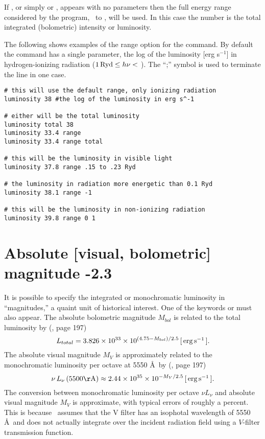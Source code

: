 If , or simply  or ,
appears with no parameters then the
full energy range considered by the program,
\emm\ to
\egamry , will be used.
In this case the number is the total integrated (bolometric) intensity
or luminosity.

The following shows examples of the range option for the
 command.
By default the  command has a single parameter,
the log of the luminosity [erg s$^{-1}$] in hydrogen-ionizing
radiation ($1 {\rm\thinspace Ryd} \le  h\nu <$ \egamry ).
The ``;'' symbol is used to terminate the line in one
case.
\begin{verbatim}
# this will use the default range, only ionizing radiation
luminosity 38 #the log of the luminosity in erg s^-1

# either will be the total luminosity
luminosity total 38
luminosity 33.4 range
luminosity 33.4 range total

# this will be the luminosity in visible light
luminosity 37.8 range .15 to .23 Ryd

# the luminosity in radiation more energetic than 0.1 Ryd
luminosity 38.1 range -1

# this will be the luminosity in non-ionizing radiation
luminosity 39.8 range 0 1
\end{verbatim}

\section{Absolute [visual, bolometric] magnitude -2.3}

It is possible to specify the integrated or monochromatic luminosity
in ``magnitudes,'' a quaint unit of historical interest.
One of the keywords
 or  must also appear.
The absolute bolometric magnitude
$M_{bol}$ is related to the total luminosity by (\citealp{Allen1976}, page 197)
\begin{equation}
L_{total}  = 3.826 \times 10^{33}  \times 10^{\left( {4.75 - M_{bol} }
\right)/2.5}\,
 [\mbox{${\rm\thinspace erg}{\rm\thinspace s}^{-1}\,$}].
\end{equation}
The absolute visual magnitude $M_V$ is approximately related to the
monochromatic luminosity per octave at 5550 \AA\
by (\citealp{Allen1976}, page 197)
\begin{equation}
\nu \,L_\nu  \left( 5500\mathrm{\AA}\right) \approx 2.44 \times 10^{35}
\times 10^{ - M_V /2.5}\,
[\ergps].
\end{equation}
The conversion between monochromatic luminosity per octave $\nu L_{\nu}$ and absolute
visual magnitude $M_V$ is approximate,
with typical errors of roughly a percent.
This is because \Cloudy\ assumes that the V filter has an
isophotal wavelength of 5550\,\AA\ and does not actually integrate
over the incident radiation field using
a $V$-filter transmission function.

